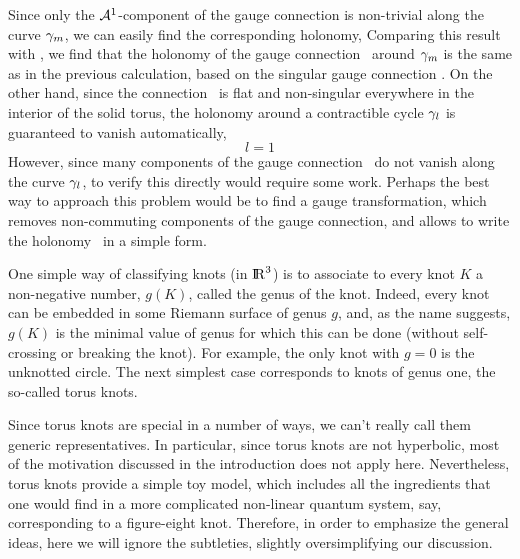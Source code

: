 Since only the ${\cal A}^1$-component of the gauge connection
is non-trivial along the curve $\gamma_m$, we can easily
find the corresponding holonomy,
%
\eqn{}
%
Comparing this result with \btzlmviar, we find that the holonomy
of the gauge connection \asmooth\ around $\gamma_m$ is the same as
in the previous calculation, based on the singular gauge connection \btzee.
On the other hand, since the connection \asmooth\ is flat
and non-singular everywhere in the interior of the solid
torus, the holonomy around a contractible cycle $\gamma_l$
is guaranteed to vanish automatically,
$$
l=1
$$
However, since many components of the gauge connection \asmooth\
do not vanish along the curve $\gamma_l$, to verify this directly
would require some work. Perhaps the best way to approach this
problem would be to find a gauge transformation,
which removes non-commuting components of the gauge connection,
and allows to write the holonomy \holfla\ in a simple form.




One simple way of classifying knots (in $\relax{\rm I\kern-.18em R}^3$) is to
associate to every knot $K$ a non-negative number, $g(K)$,
called the genus of the knot. Indeed, every knot can be embedded
in some Riemann surface of genus $g$, and, as the name suggests,
$g(K)$ is the minimal value of genus for which this can be done
(without self-crossing or breaking the knot).
For example, the only knot with $g=0$ is the unknotted circle.
The next simplest case corresponds to knots of genus one,
the so-called torus knots.

Since torus knots are special in a number of ways,
we can't really call them generic representatives.
In particular, since torus knots are not hyperbolic,
most of the motivation discussed in the introduction
does not apply here.
Nevertheless, torus knots provide a simple toy model,
which includes all the ingredients that one would find in
a more complicated non-linear quantum system,
say, corresponding to a figure-eight knot.
Therefore, in order to emphasize the general ideas,
here we will ignore the subtleties,
slightly oversimplifying our discussion.

